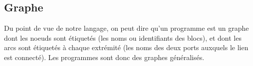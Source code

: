 \documentclass{article}
\begin{document}
\subsection{Graphe}
Du point de vue de notre langage, on peut dire qu'un programme est un graphe dont les noeuds sont étiquetés (les noms ou identifiants des blocs), et dont les arcs sont étiquetés à chaque extrémité (les noms des deux ports auxquels le lien est connecté). Les programmes sont donc des graphes généralisés.





\appendix

\nocite{*}




\long{}
\end{document}
